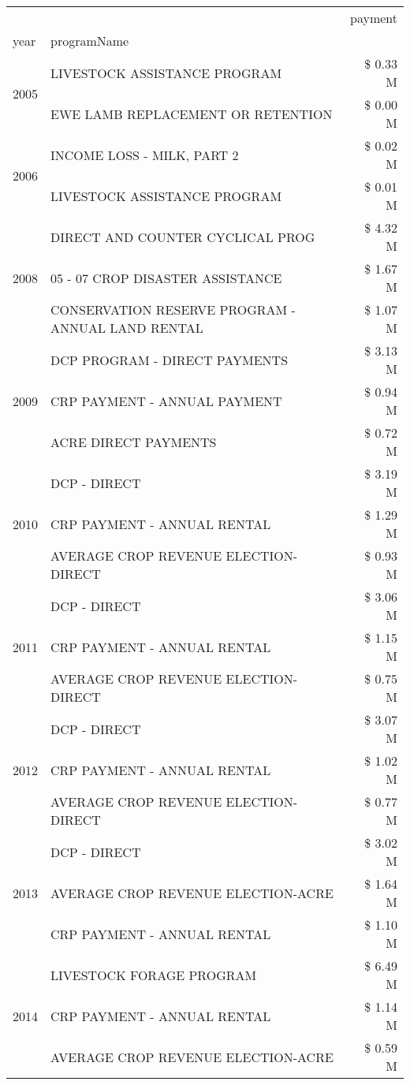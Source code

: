 \begin{tabular}{llr}
\toprule
 &  & payment \\
year & programName &  \\
\midrule
\multirow[t]{2}{*}{2005} & LIVESTOCK ASSISTANCE PROGRAM & \$ 0.33 M \\
 & EWE LAMB REPLACEMENT OR RETENTION & \$ 0.00 M \\
\cline{1-3}
\multirow[t]{2}{*}{2006} & INCOME LOSS - MILK, PART 2 & \$ 0.02 M \\
 & LIVESTOCK ASSISTANCE PROGRAM & \$ 0.01 M \\
\cline{1-3}
\multirow[t]{3}{*}{2008} & DIRECT AND COUNTER CYCLICAL PROG & \$ 4.32 M \\
 & 05 - 07 CROP DISASTER ASSISTANCE & \$ 1.67 M \\
 & CONSERVATION RESERVE PROGRAM - ANNUAL LAND RENTAL & \$ 1.07 M \\
\cline{1-3}
\multirow[t]{3}{*}{2009} & DCP PROGRAM - DIRECT PAYMENTS & \$ 3.13 M \\
 & CRP PAYMENT - ANNUAL PAYMENT & \$ 0.94 M \\
 & ACRE DIRECT PAYMENTS & \$ 0.72 M \\
\cline{1-3}
\multirow[t]{3}{*}{2010} & DCP - DIRECT & \$ 3.19 M \\
 & CRP PAYMENT - ANNUAL RENTAL & \$ 1.29 M \\
 & AVERAGE CROP REVENUE ELECTION-DIRECT & \$ 0.93 M \\
\cline{1-3}
\multirow[t]{3}{*}{2011} & DCP - DIRECT & \$ 3.06 M \\
 & CRP PAYMENT - ANNUAL RENTAL & \$ 1.15 M \\
 & AVERAGE CROP REVENUE ELECTION-DIRECT & \$ 0.75 M \\
\cline{1-3}
\multirow[t]{3}{*}{2012} & DCP - DIRECT & \$ 3.07 M \\
 & CRP PAYMENT - ANNUAL RENTAL & \$ 1.02 M \\
 & AVERAGE CROP REVENUE ELECTION-DIRECT & \$ 0.77 M \\
\cline{1-3}
\multirow[t]{3}{*}{2013} & DCP - DIRECT & \$ 3.02 M \\
 & AVERAGE CROP REVENUE ELECTION-ACRE & \$ 1.64 M \\
 & CRP PAYMENT - ANNUAL RENTAL & \$ 1.10 M \\
\cline{1-3}
\multirow[t]{3}{*}{2014} & LIVESTOCK FORAGE PROGRAM & \$ 6.49 M \\
 & CRP PAYMENT - ANNUAL RENTAL & \$ 1.14 M \\
 & AVERAGE CROP REVENUE ELECTION-ACRE & \$ 0.59 M \\

\end{tabular}
